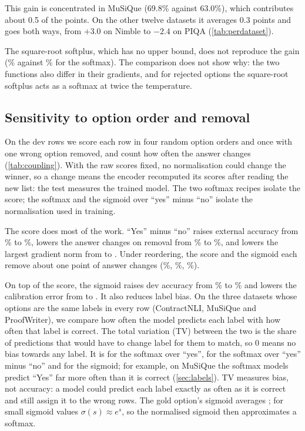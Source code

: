 This gain is concentrated in MuSiQue (69.8\% against 63.0\%), which contributes about 0.5 of the \DiffUbSigUbYesNoAbs{} points.
On the other twelve datasets it averages 0.3 points and goes both ways, from $+3.0$ on Nimble to $-2.4$ on PIQA (\cref{tab:perdataset}).

The square-root softplus, which has no upper bound, does not reproduce the gain (\TestUbSqrt{}\% against \TestUbYesNo{}\% for the softmax).
The comparison does not show why: the two functions also differ in their gradients, and for rejected options the square-root softplus acts as a softmax at twice the temperature.

\subsection{Sensitivity to option order and removal}
\label{sec:coupling}

On the dev rows we score each row in four random option orders and once with one wrong option removed, and count how often the answer changes (\cref{tab:coupling}).
With the raw scores fixed, no normalisation could change the winner, so a change means the encoder recomputed its scores after reading the new list: the test measures the trained model.
The two softmax recipes isolate the score; the softmax and the sigmoid over ``yes'' minus ``no'' isolate the normalisation used in training.

The score does most of the work.
``Yes'' minus ``no'' raises external accuracy from \CpExtYes{}\% to \CpExtYesNo{}\%, lowers the answer changes on removal from \CpDropYes{}\% to \CpDropYesNo{}\%, and lowers the largest gradient norm from \CpGradYes{} to \CpGradYesNo{}.
Under reordering, the score and the sigmoid each remove about one point of answer changes (\CpShufYes{}\%, \CpShufYesNo{}\%, \CpShufSig{}\%).

On top of the score, the sigmoid raises dev accuracy from \CpAccYesNo{}\% to \CpAccSig{}\% and lowers the calibration error from \CpEceYesNo{} to \CpEceSig{}.
It also reduces label bias.
On the three datasets whose options are the same labels in every row (ContractNLI, MuSiQue and ProofWriter), we compare how often the model predicts each label with how often that label is correct.
The total variation (TV) between the two is the share of predictions that would have to change label for them to match, so 0 means no bias towards any label.
It is \CpLabelYes{} for the softmax over ``yes'', \CpLabelYesNo{} for the softmax over ``yes'' minus ``no'' and \CpLabelSig{} for the sigmoid; for example, on MuSiQue the softmax models predict ``Yes'' far more often than it is correct (\cref{sec:labels}).
TV measures bias, not accuracy: a model could predict each label exactly as often as it is correct and still assign it to the wrong rows.
The gold option's sigmoid averages \CpSigGoldSig{}; for small sigmoid values $\sigma(s)\approx e^{s}$, so the normalised sigmoid then approximates a softmax.

